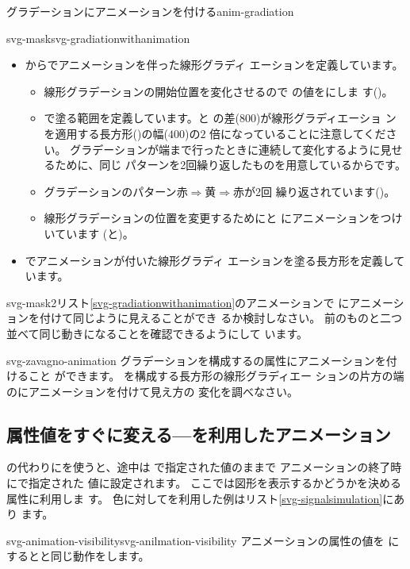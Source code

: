{グラデーションにアニメーションを付ける}{anim-gradiation} 

     {svg-mask}{svg-gradiationwithanimation}
\begin{itemize}
 \item {}からでアニメーションを伴った線形グラディ
       エーションを定義しています。
\begin{itemize}
 \item 線形グラデーションの開始位置を変化させるので
       の値をにしま
       す()。
 \item {}で塗る範囲を定義しています。と
       の差($800$)が線形グラディエーショ
       ンを適用する長方形()の幅($400$)の$2$
       倍になっていることに注意してください。
グラデーションが端まで行ったときに連続して変化するように見せるために、同じ
       パターンを2回繰り返したものを用意しているからです。
 \item グラデーションのパターン$赤\Rightarrow 黄\Rightarrow 赤$が2回
       繰り返されています()。
 \item 線形グラデーションの位置を変更するためにと
       にアニメーションをつけいています
       (と)。
\end{itemize}
 \item {}でアニメーションが付いた線形グラディ
       エーションを塗る長方形を定義しています。
\end{itemize}

{svg-mask2}{リスト\ref{svg-gradiationwithanimation}のアニメーションで
 にアニメーションを付けて同じように見えることができ
 るか検討しなさい。}
{前のものと二つ並べて同じ動きになることを確認できるようにして
 います。}

{svg-zavagno-animation}
{グラデーションを構成するの属性にアニメーションを付けること
ができます。
を構成する長方形の線形グラディエー
 ションの片方の端のにアニメーションを付けて見え方の
 変化を調べなさい。}

\subsection{属性値をすぐに変える---を利用したアニメーション}
\label{visibility-hidden}
の代わりにを使うと、途中は
で指定された値のままで
アニメーションの終了時にで指定された
値に設定されます。
ここでは図形を表示するかどうかを決める属性に利用しま
す。
%
色に対してを利用した例はリスト\ref{svg-signalsimulation}にあり
ます。%

%
{svg-animation-visibility}{svg-anilmation-visibility}
アニメーションの属性の値を
にするとと同じ動作をします。
